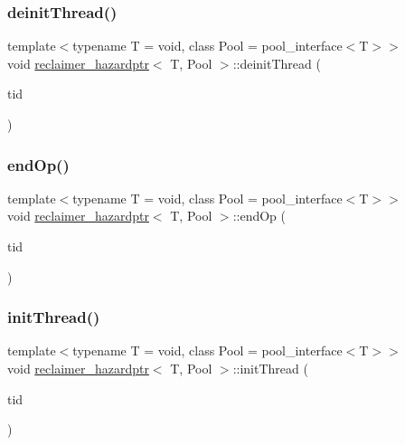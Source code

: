 \subsubsection{\texorpdfstring{deinit\+Thread()}{deinitThread()}}
{\footnotesize\ttfamily template$<$typename T  = void, class Pool  = pool\+\_\+interface$<$\+T$>$$>$ \\
void \hyperlink{classreclaimer__hazardptr}{reclaimer\+\_\+hazardptr}$<$ T, Pool $>$\+::deinit\+Thread (\begin{DoxyParamCaption}\item[{const int}]{tid }\end{DoxyParamCaption})\hspace{0.3cm}{\ttfamily [inline]}}

\mbox{\label{classreclaimer__hazardptr_af35ab51d584f989c3a4fa2c00bcdcdf3}} 
\subsubsection{\texorpdfstring{end\+Op()}{endOp()}}
{\footnotesize\ttfamily template$<$typename T  = void, class Pool  = pool\+\_\+interface$<$\+T$>$$>$ \\
void \hyperlink{classreclaimer__hazardptr}{reclaimer\+\_\+hazardptr}$<$ T, Pool $>$\+::end\+Op (\begin{DoxyParamCaption}\item[{const int}]{tid }\end{DoxyParamCaption})\hspace{0.3cm}{\ttfamily [inline]}}

\mbox{\label{classreclaimer__hazardptr_a500063d57382d8168a401fdc633aef10}} 
\subsubsection{\texorpdfstring{init\+Thread()}{initThread()}}
{\footnotesize\ttfamily template$<$typename T  = void, class Pool  = pool\+\_\+interface$<$\+T$>$$>$ \\
void \hyperlink{classreclaimer__hazardptr}{reclaimer\+\_\+hazardptr}$<$ T, Pool $>$\+::init\+Thread (\begin{DoxyParamCaption}\item[{const int}]{tid }\end{DoxyParamCaption})\hspace{0.3cm}{\ttfamily [inline]}}

